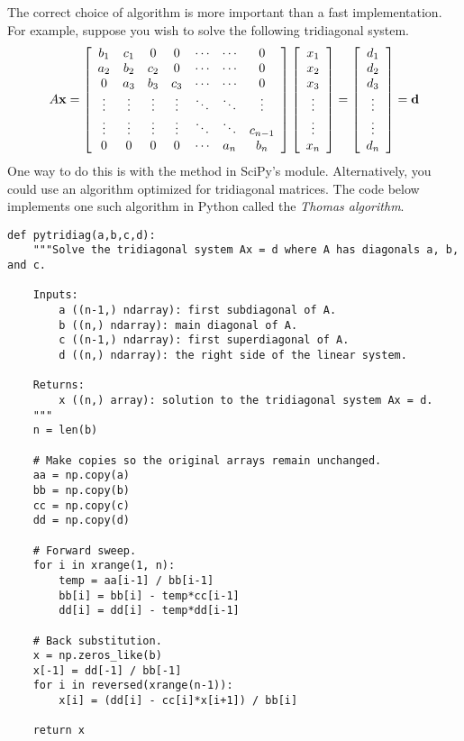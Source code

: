 The correct choice of algorithm is more important than a fast implementation.
For example, suppose you wish to solve the following tridiagonal system.
\[
A\mathbf{x} = \left[\begin{array}{ccccccc}
b_1 & c_1 & 0 & 0 & \cdots & \cdots & 0 \\
a_2 & b_2 & c_2 & 0 & \cdots & \cdots & 0 \\
0 & a_3 & b_3 & c_3 & \cdots & \cdots & 0 \\
\vdots & \vdots & \vdots & \vdots & \ddots & \ddots & \vdots \\
\vdots & \vdots & \vdots & \vdots & \ddots & \ddots & c_{n-1} \\
0 & 0 & 0 & 0 & \cdots & a_n & b_n
\end{array}\right]
\left[\begin{array}{c}
x_1 \\ x_2 \\ x_3\\ \vdots \\ \vdots \\ x_n
\end{array}\right]
=
\left[\begin{array}{c}
d_1 \\ d_2 \\ d_3 \\ \vdots \\ \vdots \\ d_n
\end{array}\right] = \mathbf{d}
\]
One way to do this is with the  method in SciPy's  module.
Alternatively, you could use an algorithm optimized for tridiagonal matrices.
The code below implements one such algorithm in Python called the \emph{Thomas algorithm}.

\begin{lstlisting}
def pytridiag(a,b,c,d):
    """Solve the tridiagonal system Ax = d where A has diagonals a, b, and c.

    Inputs:
        a ((n-1,) ndarray): first subdiagonal of A.
        b ((n,) ndarray): main diagonal of A.
        c ((n-1,) ndarray): first superdiagonal of A.
        d ((n,) ndarray): the right side of the linear system.

    Returns:
        x ((n,) array): solution to the tridiagonal system Ax = d.
    """
    n = len(b)

    # Make copies so the original arrays remain unchanged.
    aa = np.copy(a)
    bb = np.copy(b)
    cc = np.copy(c)
    dd = np.copy(d)

    # Forward sweep.
    for i in xrange(1, n):
        temp = aa[i-1] / bb[i-1]
        bb[i] = bb[i] - temp*cc[i-1]
        dd[i] = dd[i] - temp*dd[i-1]

    # Back substitution.
    x = np.zeros_like(b)
    x[-1] = dd[-1] / bb[-1]
    for i in reversed(xrange(n-1)):
        x[i] = (dd[i] - cc[i]*x[i+1]) / bb[i]

    return x
\end{lstlisting}

